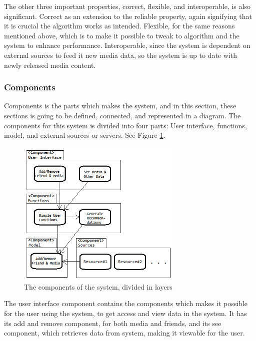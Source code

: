 The other three important properties, correct, flexible, and interoperable, is also significant. Correct as an extension to the reliable property, again signifying that it is crucial the algorithm works as intended. Flexible, for the same reasons mentioned above, which is to make it possible to tweak to algorithm and the system to enhance performance. Interoperable, since the system is dependent on external sources to feed it new media data, so the system is up to date with newly released media content.

\subsubsection{Components}

Components is the parts which makes the system, and in this section, these sections is going to be defined, connected, and represented in a diagram. The components for this system is divided into four parts: User interface, functions, model, and external sources or servers. See Figure \ref{Components}.

\begin{figure}[htb]
\centering
\includegraphics[width=0.7\textwidth]{Images/Components.png}
\caption{The components of the system, divided in layers}
\label{Components}
\end{figure}

The user interface component contains the components which makes it possible for the user using the system, to get access and view data in the system. It has its add and remove component, for both media and friends, and its see component, which retrieves data from system, making it viewable for the user.

